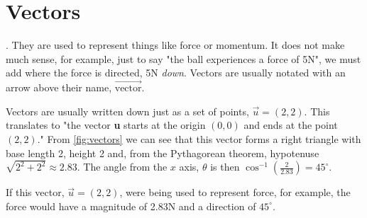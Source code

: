 \documentclass{tufte-book}
\begin{document}
\section{Vectors}

. They are used to represent things like force
or momentum. It does not make much sense, for example, just to say "the ball experiences a force of 5N", we must
add where the force is directed, 5N \emph{down}. Vectors are usually notated with an arrow above their name,
$\overrightarrow{\text{vector}}$.

\begin{marginfigure}
	\caption{Vectors can be defined both by the point they end on, and their length and angle from an axis.}
	\label{fig:vectors}
\end{marginfigure}

Vectors are usually written down just as a set of points, $\vec{u}=(2,2)$. This translates to "the vector \textbf{u}
starts at the origin $(0,0)$ and ends at the point $(2,2)$." From \cref{fig:vectors} we can see
that this vector forms a right triangle with base length 2, height 2 and, from the Pythagorean theorem, hypotenuse
$\sqrt{2^2+2^2} \approx 2.83$. The angle from the $x$ axis, $\theta$ is then $\cos^{-1}\left(\frac{2}{2.83}\right)=45^{\circ}$.

If this vector, $\vec{u}=(2,2)$, were being used to represent force, for example, the force would have a magnitude of
2.83N and a direction of $45^{\circ}$.
\end{document}
